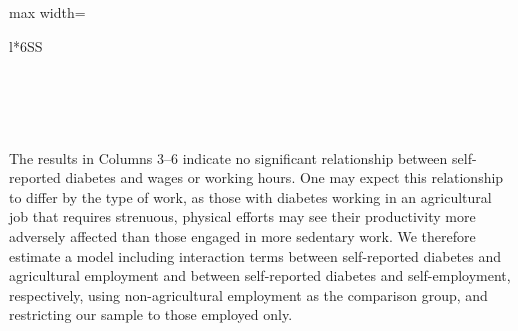 \documentclass[12pt,english]{article}
\begin{document}
{\begin{table}[h]
\begin{center}
\begin{adjustbox}{max width=\textwidth}
{\begin{tabular}{l*{6}{SS}}
\\
\\
\\
\\
\\
\end{tabular}%
}
\end{adjustbox}
\end{center}
\end{table}

The results in Columns 3--6 indicate no significant relationship between self-reported diabetes and wages or working hours. One may expect this relationship to differ by the type of work, as those  with diabetes working in an agricultural job that requires strenuous, physical efforts may see their productivity more adversely affected than those engaged in more sedentary work. We therefore estimate a model including interaction terms between self-reported diabetes and agricultural employment and between self-reported diabetes and self-employment, respectively, using non-agricultural employment as the comparison group, and restricting our sample to those employed only. 


}
\end{document}
